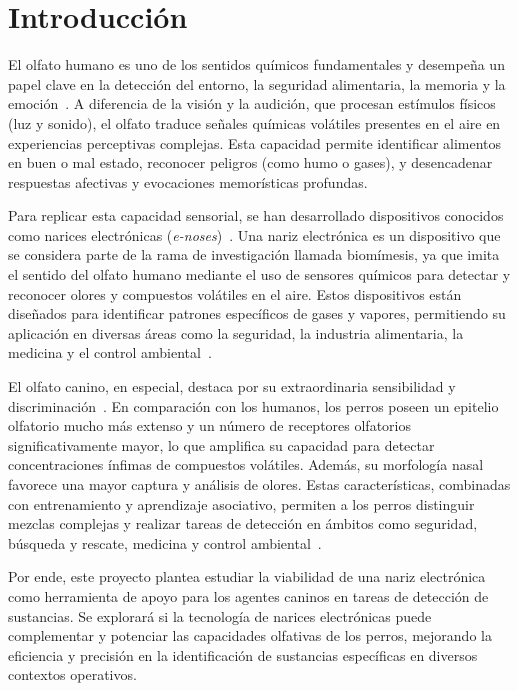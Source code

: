 \chapter{Introducción}

El olfato humano es uno de los sentidos químicos fundamentales y desempeña un papel clave en la detección del entorno, la seguridad alimentaria, la memoria y la emoción~\cite{BuckAxel1991}. A diferencia de la visión y la audición, que procesan estímulos físicos (luz y sonido), el olfato traduce señales químicas volátiles presentes en el aire en experiencias perceptivas complejas. Esta capacidad permite identificar alimentos en buen o mal estado, reconocer peligros (como humo o gases), y desencadenar respuestas afectivas y evocaciones memorísticas profundas.
\par

Para replicar esta capacidad sensorial, se han desarrollado dispositivos conocidos como narices electrónicas (\textit{e-noses})~\cite{PersaudDodd1982,GardnerBartlett1994}. Una nariz electrónica es un dispositivo que se considera parte de la rama de investigación llamada biomímesis, ya que imita el sentido del olfato humano mediante el uso de sensores químicos para detectar y reconocer olores y compuestos volátiles en el aire. Estos dispositivos están diseñados para identificar patrones específicos de gases y vapores, permitiendo su aplicación en diversas áreas como la seguridad, la industria alimentaria, la medicina y el control ambiental~\cite{KarakayaUlucanTurkan2020}.
\par

El olfato canino, en especial, destaca por su extraordinaria sensibilidad y discriminación~\cite{FurtonMyers2001}. En comparación con los humanos, los perros poseen un epitelio olfatorio mucho más extenso y un número de receptores olfatorios significativamente mayor, lo que amplifica su capacidad para detectar concentraciones ínfimas de compuestos volátiles. Además, su morfología nasal favorece una mayor captura y análisis de olores. Estas características, combinadas con entrenamiento y aprendizaje asociativo, permiten a los perros distinguir mezclas complejas y realizar tareas de detección en ámbitos como seguridad, búsqueda y rescate, medicina y control ambiental~\cite{LorenzoEtAl2003}.
\par

Por ende, este proyecto plantea estudiar la viabilidad de una nariz electrónica como herramienta de apoyo para los agentes caninos en tareas de detección de sustancias. Se explorará si la tecnología de narices electrónicas puede complementar y potenciar las capacidades olfativas de los perros, mejorando la eficiencia y precisión en la identificación de sustancias específicas en diversos contextos operativos.
%

